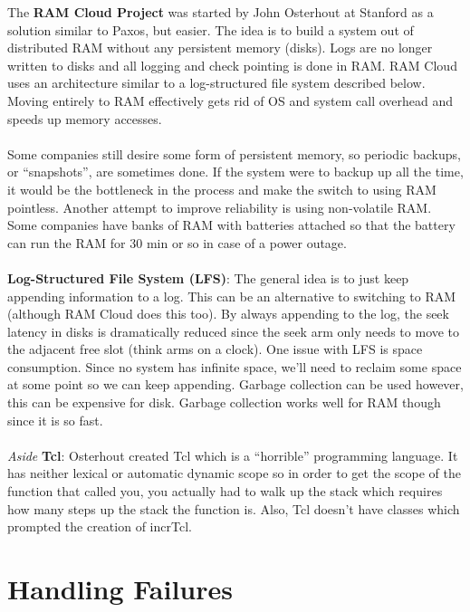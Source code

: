 \documentclass[twoside]{article}
\begin{document}
The \textbf{RAM Cloud Project} was started by John Osterhout at Stanford as a solution similar to Paxos, but easier.  The idea is to build a system out of distributed RAM without any persistent memory (disks).  Logs are no longer written to disks and all logging and check pointing is done in RAM.  RAM Cloud uses an architecture similar to a log-structured file system described below.  Moving entirely to RAM effectively gets rid of OS and system call overhead and speeds up memory accesses.\\
\\
Some companies still desire some form of persistent memory, so periodic backups, or ``snapshots'', are sometimes done.  If the system were to backup up all the time, it would be the bottleneck in the process and make the switch to using RAM pointless.  Another attempt to improve reliability is using non-volatile RAM.  Some companies have banks of RAM with batteries attached so that the battery can run the RAM for 30 min or so in case of a power outage.\\
\\
\textbf{Log-Structured File System (LFS)}: The general idea is to just keep appending information to a log.  This can be an alternative to switching to RAM (although RAM Cloud does this too).  By always appending to the log, the seek latency in disks is dramatically reduced since the seek arm only needs to move to the adjacent free slot (think arms on a clock).  One issue with LFS is space consumption.  Since no system has infinite space, we'll need to reclaim some space at some point so we can keep appending.  Garbage collection can be used however, this can be expensive for disk.  Garbage collection works well for RAM though since it is so fast.\\
\\
{\em Aside} \textbf{Tcl}: Osterhout created Tcl which is a ``horrible'' programming language.  It has neither lexical or automatic dynamic scope so in order to get the scope of the function that called you, you actually had to walk up the stack which requires how many steps up the stack the function is.  Also, Tcl doesn't have classes which prompted the creation of incrTcl.

\section{Handling Failures}
\end{document}
